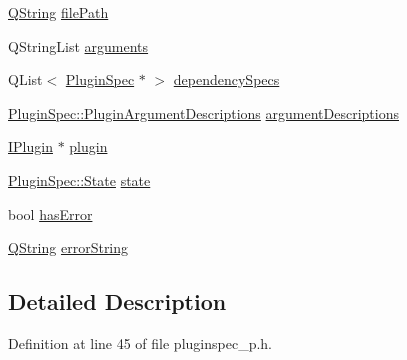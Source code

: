\begin{DoxyCompactItemize}
\item 
\hyperlink{group___u_a_v_objects_plugin_gab9d252f49c333c94a72f97ce3105a32d}{\-Q\-String} \hyperlink{class_extension_system_1_1_internal_1_1_plugin_spec_private_a048e4d091eccd93affd5c38b841ad2ed}{file\-Path}
\item 
\-Q\-String\-List \hyperlink{class_extension_system_1_1_internal_1_1_plugin_spec_private_ae1681eb5cafc61fa0736e1a75b557c20}{arguments}
\item 
\-Q\-List$<$ \hyperlink{class_extension_system_1_1_plugin_spec}{\-Plugin\-Spec} $\ast$ $>$ \hyperlink{class_extension_system_1_1_internal_1_1_plugin_spec_private_abd32e8602856b2fe48fed8140846be54}{dependency\-Specs}
\item 
\hyperlink{class_extension_system_1_1_plugin_spec_acf81cc5fcc20b047203f9da886cbbdee}{\-Plugin\-Spec\-::\-Plugin\-Argument\-Descriptions} \hyperlink{class_extension_system_1_1_internal_1_1_plugin_spec_private_a32dd76917c01771fb0ad25ff50193fbc}{argument\-Descriptions}
\item 
\hyperlink{class_extension_system_1_1_i_plugin}{\-I\-Plugin} $\ast$ \hyperlink{class_extension_system_1_1_internal_1_1_plugin_spec_private_a45c4fa79923c8d0624258b8f733125f1}{plugin}
\item 
\hyperlink{class_extension_system_1_1_plugin_spec_a3d40e1bd1f17eb32b314bcd282b3e3b9}{\-Plugin\-Spec\-::\-State} \hyperlink{class_extension_system_1_1_internal_1_1_plugin_spec_private_a1806625ef956622e6727d0b0d50274aa}{state}
\item 
bool \hyperlink{class_extension_system_1_1_internal_1_1_plugin_spec_private_aaee87e26d32c27c408a5059bd821b217}{has\-Error}
\item 
\hyperlink{group___u_a_v_objects_plugin_gab9d252f49c333c94a72f97ce3105a32d}{\-Q\-String} \hyperlink{class_extension_system_1_1_internal_1_1_plugin_spec_private_a1fdbeffffeb8b7a7dbb2d30417674d83}{error\-String}
\end{DoxyCompactItemize}


\subsection{\-Detailed \-Description}


\-Definition at line 45 of file pluginspec\-\_\-p.\-h.



